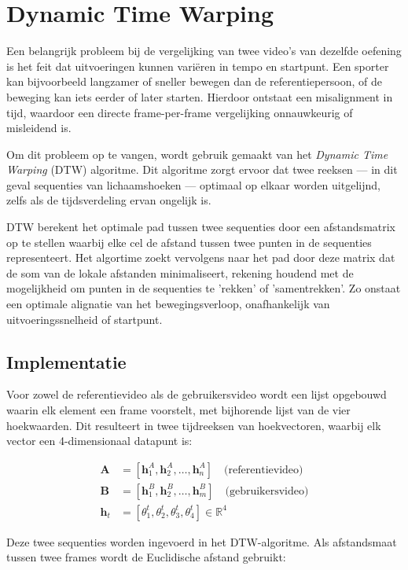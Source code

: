 \section{Dynamic Time Warping}
Een belangrijk probleem bij de vergelijking van twee video’s van dezelfde oefening is het feit dat uitvoeringen kunnen variëren in tempo en startpunt. 
Een sporter kan bijvoorbeeld langzamer of sneller bewegen dan de referentiepersoon, of de beweging kan iets eerder of later starten. 
Hierdoor ontstaat een misalignment in tijd, waardoor een directe frame-per-frame vergelijking onnauwkeurig of misleidend is.

Om dit probleem op te vangen, wordt gebruik gemaakt van het \textit{Dynamic Time Warping} (DTW) algoritme. 
Dit algoritme zorgt ervoor dat twee reeksen — in dit geval sequenties van lichaamshoeken — optimaal op elkaar worden uitgelijnd, zelfs als de tijdsverdeling ervan ongelijk is.

DTW berekent het optimale pad tussen twee sequenties door een afstandsmatrix op te stellen waarbij elke cel de afstand tussen twee punten in de sequenties representeert.
Het algortime zoekt vervolgens naar het pad door deze matrix dat de som van de lokale afstanden minimaliseert, rekening houdend met de mogelijkheid om punten in de sequenties te 'rekken' of 'samentrekken'.
Zo onstaat een optimale alignatie van het bewegingsverloop, onafhankelijk van uitvoeringssnelheid of startpunt.


\subsection{Implementatie}

Voor zowel de referentievideo als de gebruikersvideo wordt een lijst opgebouwd waarin elk element een frame voorstelt, met bijhorende lijst van de vier hoekwaarden. 
Dit resulteert in twee tijdreeksen van hoekvectoren, waarbij elk vector een 4-dimensionaal datapunt is:

\begin{align*}
    \textbf{A} &= [\mathbf{h}_1^A, \mathbf{h}_2^A, \dots, \mathbf{h}_n^A] \quad \text{(referentievideo)} \\
    \textbf{B} &= [\mathbf{h}_1^B, \mathbf{h}_2^B, \dots, \mathbf{h}_m^B] \quad \text{(gebruikersvideo)} \\
    \mathbf{h}_t &= [\theta_1^t, \theta_2^t, \theta_3^t, \theta_4^t] \in \mathbb{R}^4
\end{align*}

Deze twee sequenties worden ingevoerd in het DTW-algoritme. 
Als afstandsmaat tussen twee frames wordt de Euclidische afstand gebruikt:

